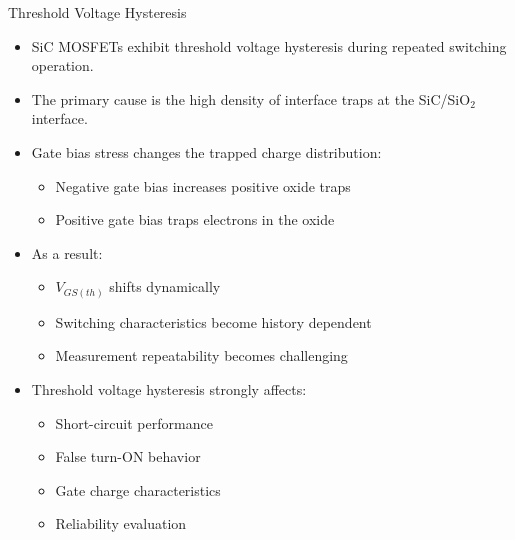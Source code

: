 \begin{frame}{Threshold Voltage Hysteresis}
\begin{itemize}
    \item SiC MOSFETs exhibit threshold voltage hysteresis during repeated switching operation.

    \item The primary cause is the high density of interface traps at the SiC/SiO\(_2\) interface.

    \item Gate bias stress changes the trapped charge distribution:
    \begin{itemize}
        \item Negative gate bias increases positive oxide traps
        \item Positive gate bias traps electrons in the oxide
    \end{itemize}

    \item As a result:
    \begin{itemize}
        \item \(V_{GS(th)}\) shifts dynamically
        \item Switching characteristics become history dependent
        \item Measurement repeatability becomes challenging
    \end{itemize}

    \item Threshold voltage hysteresis strongly affects:
    \begin{itemize}
        \item Short-circuit performance
        \item False turn-ON behavior
        \item Gate charge characteristics
        \item Reliability evaluation
    \end{itemize}
\end{itemize}
\end{frame}



